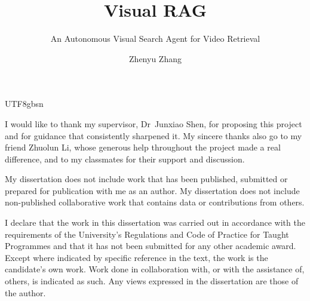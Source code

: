 \documentclass[
  bibstyle=ieee,         %
  twoside=false,         %
]{uob-thesis}
\title{Visual RAG}
\subtitle{An Autonomous Visual Search Agent for Video Retrieval}
\author{Zhenyu Zhang}
\date{\printdatewithoutmonth{thesisdate}}
\renewcommand*{\cleardoubleoddemptypage}{\clearpage}
\begin{document}
\begin{CJK*}{UTF8}{gbsn}

\hypersetup{pageanchor=false}
\maketitle
\cleardoubleoddemptypage

\begin{abstract}
\end{abstract}

\begin{acknowledgements}
  I would like to thank my supervisor, Dr~Junxiao Shen, for proposing this
  project and for guidance that consistently sharpened it. My sincere thanks
  also go to my friend Zhuolun Li, whose generous help throughout the project
  made a real difference, and to my classmates for their support and
  discussion.
\end{acknowledgements}


\begin{statement}
My dissertation does not include work that has been published, submitted or prepared for publication with me as an author.
My dissertation does not include non-published collaborative work that contains data or contributions from others.
\end{statement}

\begin{declaration}
  I declare that the work in this dissertation was carried out in accordance
  with the requirements of the University's Regulations and Code of Practice for
  Taught Programmes and that it has not been submitted for any other academic award.
  Except where indicated by specific reference in the text, the work is the
  candidate's own work. Work done in collaboration with, or with the assistance
  of, others, is indicated as such. Any views expressed in the
  dissertation are those of the author.

  \vspace{2cm}


\end{declaration}
\end{CJK*}
\end{document}
